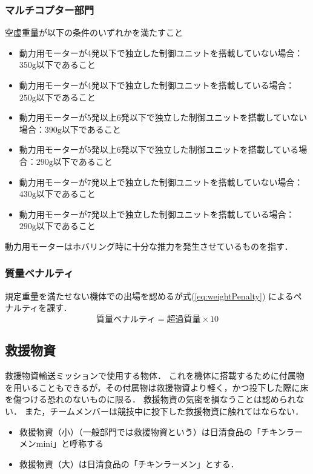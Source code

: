 \documentclass[a4paper,12pt,oneside]{jsarticle}
\begin{document}
\subsubsection{マルチコプター部門}
空虚重量が以下の条件のいずれかを満たすこと
\begin{itemize}
  \item 動力用モーターが4発以下で独立した制御ユニットを搭載していない場合：$350\mathrm{g}$以下であること
  \item 動力用モーターが4発以下で独立した制御ユニットを搭載している場合：$250\mathrm{g}$以下であること
  \item 動力用モーターが5発以上6発以下で独立した制御ユニットを搭載していない場合：$390\mathrm{g}$以下であること
  \item 動力用モーターが5発以上6発以下で独立した制御ユニットを搭載している場合：$290\mathrm{g}$以下であること
  \item 動力用モーターが7発以上で独立した制御ユニットを搭載していない場合：$430\mathrm{g}$以下であること
  \item 動力用モーターが7発以上で独立した制御ユニットを搭載している場合：$290\mathrm{g}$以下であること
\end{itemize}
動力用モーターはホバリング時に十分な推力を発生させているものを指す．
\subsubsection{質量ペナルティ}
規定重量を満たせない機体での出場を認めるが式(\ref{eq:weightPenalty}) によるペナルティを課す．
\begin{equation}\label{eq:weightPenalty}
  質量ペナルティ = 超過質量 \times 10
\end{equation}

\subsection{救援物資}
救援物資輸送ミッションで使用する物体．
これを機体に搭載するために付属物を用いることもできるが，その付属物は救援物資より軽く，かつ投下した際に床を傷つける恐れのないものに限る．
救援物資の気密を損なうことは認められない．
また，チームメンバーは競技中に投下した救援物資に触れてはならない．
\begin{itemize}
  \item 救援物資（小）（一般部門では救援物資という）は日清食品の「チキンラーメンmini」と呼称する
  \item 救援物資（大）は日清食品の「チキンラーメン」とする．
\end{itemize}
\end{document}
